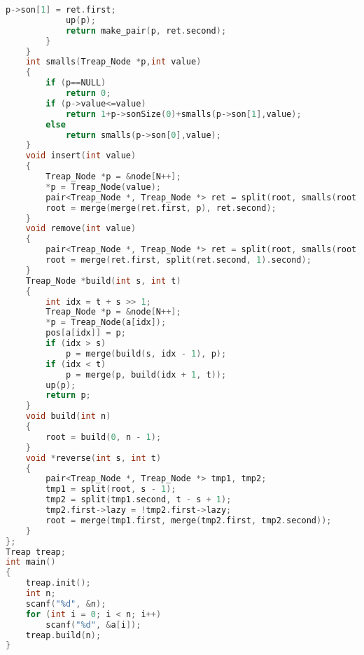 \begin{lstlisting}[language=c++]
            p->son[1] = ret.first;
            up(p);
            return make_pair(p, ret.second);
        }
    }
    int smalls(Treap_Node *p,int value)
    {
        if (p==NULL)
            return 0;
        if (p->value<=value)
            return 1+p->sonSize(0)+smalls(p->son[1],value);
        else
            return smalls(p->son[0],value);
    }
    void insert(int value)
    {
        Treap_Node *p = &node[N++];
        *p = Treap_Node(value);
        pair<Treap_Node *, Treap_Node *> ret = split(root, smalls(root, value));
        root = merge(merge(ret.first, p), ret.second);
    }
    void remove(int value)
    {
        pair<Treap_Node *, Treap_Node *> ret = split(root, smalls(root, value) - 1);
        root = merge(ret.first, split(ret.second, 1).second);
    }
    Treap_Node *build(int s, int t)
    {
        int idx = t + s >> 1;
        Treap_Node *p = &node[N++];
        *p = Treap_Node(a[idx]);
        pos[a[idx]] = p;
        if (idx > s)
            p = merge(build(s, idx - 1), p);
        if (idx < t)
            p = merge(p, build(idx + 1, t));
        up(p);
        return p;
    }
    void build(int n)
    {
        root = build(0, n - 1);
    }
    void *reverse(int s, int t)
    {
        pair<Treap_Node *, Treap_Node *> tmp1, tmp2;
        tmp1 = split(root, s - 1);
        tmp2 = split(tmp1.second, t - s + 1);
        tmp2.first->lazy = !tmp2.first->lazy;
        root = merge(tmp1.first, merge(tmp2.first, tmp2.second));
    }
};
Treap treap;
int main()
{
    treap.init();
    int n;
    scanf("%d", &n);
    for (int i = 0; i < n; i++)
        scanf("%d", &a[i]);
    treap.build(n);
}
    \end{lstlisting}